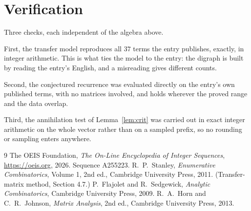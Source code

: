 \documentclass[11pt,a4paper]{article}
\theoremstyle{plain}
\theoremstyle{definition}
\begin{document}
\section{Verification}

Three checks, each independent of the algebra above.

First, the transfer model reproduces all $37$ terms the entry publishes, exactly, in
integer arithmetic. This is what ties the model to the entry: the digraph is built by reading
the entry's English, and a misreading gives different counts.

Second, the conjectured recurrence was evaluated directly on the entry's own published terms,
with no matrices involved, and holds wherever the proved range and the data overlap.

Third, the annihilation test of Lemma~\ref{lem:crit} was carried out in exact integer
arithmetic on the whole vector rather than on a sampled prefix, so no rounding or sampling
enters anywhere.

\begin{thebibliography}{9}
 The OEIS Foundation, \emph{The On-Line Encyclopedia of Integer
Sequences}, \url{https://oeis.org}, 2026. Sequence A255223.
 R.~P.~Stanley, \emph{Enumerative Combinatorics}, Volume 1, 2nd ed.,
Cambridge University Press, 2011. (Transfer-matrix method, Section 4.7.)
 P.~Flajolet and R.~Sedgewick, \emph{Analytic Combinatorics}, Cambridge
University Press, 2009.
 R.~A.~Horn and C.~R.~Johnson, \emph{Matrix Analysis}, 2nd ed., Cambridge
University Press, 2013.
\end{thebibliography}
\end{document}
